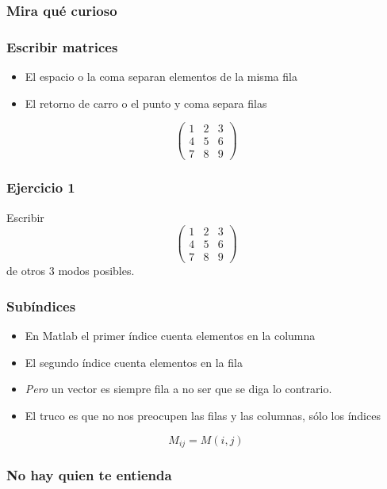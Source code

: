 \documentclass[12pt]{beamer}
\begin{document}
\begin{frame}
  \frametitle{Mira qué curioso}
  \testcode
\end{frame}

\begin{frame}
\frametitle{Escribir matrices}
\begin{itemize}
  \item El espacio o la coma separan elementos de la misma fila
  \item El retorno de carro o el punto y coma separa filas
\end{itemize}
\[ \left(
\begin{array}{ccc}
1&2&3\\
4&5&6\\
7&8&9
\end{array} \right)
\]
\end{frame}



\begin{frame}
\frametitle{Ejercicio 1}
\testcode
Escribir 
\[ \left(
\begin{array}{ccc}
1&2&3\\
4&5&6\\
7&8&9
\end{array} \right)
\]
de otros 3 modos posibles.
\end{frame}

\begin{frame}
\frametitle{Subíndices}
\begin{itemize}
  \item En Matlab el primer índice cuenta elementos en la columna
  \item El segundo índice cuenta elementos en la fila
  \item \emph{Pero} un vector es siempre fila a no ser que se diga lo
    contrario.
  \item El truco es que no nos preocupen las filas y las columnas,
    sólo los índices
\end{itemize}
\[ M_{ij} = M(i,j) \]
\end{frame}

\begin{frame}
\frametitle{No hay quien te entienda}
\testcode
\end{frame}
\end{document}
